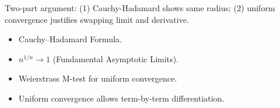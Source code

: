\begin{remark*}
Two-part argument: (1) Cauchy-Hadamard shows same radius; (2) uniform convergence justifies swapping limit and derivative.
\end{remark*}

\begin{remark*}[Dependencies]
\begin{itemize}
  \item Cauchy--Hadamard Formula.
  \item $n^{1/n} \to 1$ (Fundamental Asymptotic Limits).
  \item Weierstrass M-test for uniform convergence.
  \item Uniform convergence allows term-by-term differentiation.
\end{itemize}
\end{remark*}
